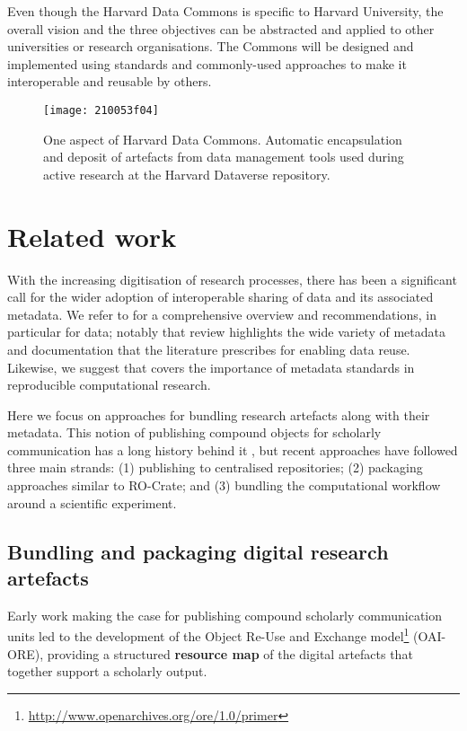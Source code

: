 \documentclass[ds,v1.1.2,openaccess]{iosart2x}%
\begin{document}
Even though the Harvard Data Commons is specific to Harvard University,
the overall vision and the three objectives can be abstracted and
applied to other universities or research organisations. The Commons
will be designed and implemented using standards and commonly-used
approaches to make it interoperable and reusable by others.

\begin{figure}%
\texttt{[image: 210053f04]}
\caption{One aspect of Harvard Data Commons. Automatic
encapsulation and deposit of artefacts from data management tools used
during active research at the Harvard Dataverse repository.}
\label{fig:hdc}
\end{figure}

 \section{Related work}%

\label{sec:relatedwork}

With the increasing digitisation of research processes, there has been
a significant call for the wider adoption of interoperable sharing of
data and its associated metadata. We refer to
\cite{doi:10.1016/j.patter.2020.100136} for a comprehensive overview and
recommendations, in particular for data; notably that review highlights
the wide variety of metadata and documentation that the literature
prescribes for enabling data reuse. Likewise, we suggest
\cite{doi:10.1016/j.patter.2021.100322} that covers the importance of
metadata standards in reproducible computational research.

Here we focus on approaches for bundling research artefacts along with
their metadata. This notion of publishing compound objects for
scholarly communication has a long history behind it
\cite{doi:10.1190/1.1822162,vandesompel_2007}, but recent approaches
have followed three main strands: (1) publishing to centralised
repositories; (2) packaging approaches similar to RO-Crate; and (3)
bundling the computational workflow around a scientific experiment.

 \subsection{Bundling and packaging digital research artefacts}

Early work making the case for publishing compound scholarly
communication units \cite{vandesompel_2007} led to the development of the
Object Re-Use and Exchange
model\footnote{\url{http://www.openarchives.org/ore/1.0/primer}} (OAI-ORE), providing
a structured \textbf{resource map} of the digital artefacts that together
support a scholarly output.
\end{document}
